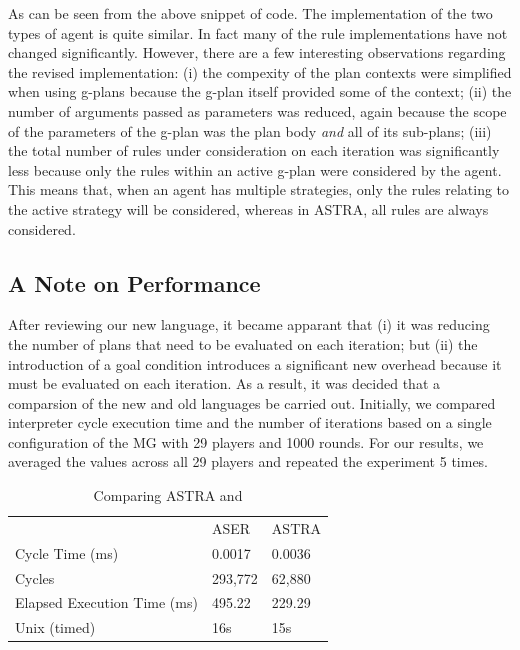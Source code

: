 As can be seen from the above snippet of code. The implementation of the two types of agent
is quite similar. In fact many of the rule implementations have not changed significantly.
However, there are a few interesting observations regarding the revised implementation: (i) the 
compexity of the plan contexts were simplified when using g-plans because the g-plan itself 
provided some of the context; (ii) the number of arguments passed as parameters was reduced, 
again because the scope of the parameters of the g-plan was the plan body \emph{and} all of 
its sub-plans; (iii) the total number of rules under consideration on each iteration was
significantly less because only the rules within an active g-plan were considered by the
agent. This means that, when an agent has multiple strategies, only the rules relating to
the active strategy will be considered, whereas in ASTRA, all rules are always considered.

\subsection{A Note on Performance}
\label{performance}

After reviewing our new language, it became apparant that (i) it was reducing the number of plans 
that need to be evaluated on each iteration; but (ii) the introduction of a goal condition introduces
a significant new overhead because it must be evaluated on each iteration.
As a result, it was decided that a comparsion of the new and old languages be carried out. Initially,
we compared interpreter cycle execution time and the number of iterations based on a single 
configuration of the MG with 29 players and 1000 rounds. For our results, we averaged
the values across all 29 players and repeated the experiment 5 times.

\begin{table}[]
\centering
\caption{Comparing ASTRA and {\aser}}
\label{comparison}
\begin{tabular}{lll}
                            & ASER    & ASTRA  \\
Cycle Time (ms)             & 0.0017  & 0.0036 \\
Cycles                      & 293,772 & 62,880 \\
Elapsed Execution Time (ms) & 495.22  & 229.29 \\
Unix (timed)                & 16s     & 15s   
\end{tabular}
\end{table}

